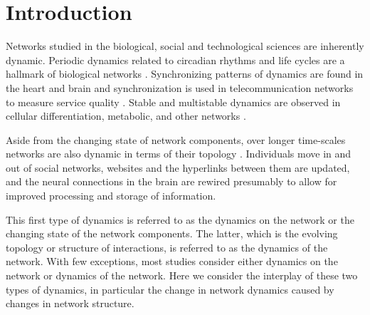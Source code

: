 \documentclass[12pt]{thesis}
\begin{document}

% 

\tableofcontents
\listoffigures

\mainmatter

\chapter{Introduction}\label{chapt:intro}
Networks studied in the biological, social and technological sciences are inherently dynamic.
Periodic dynamics related to circadian rhythms and life cycles are a hallmark of biological networks \cite{1}.
Synchronizing patterns of dynamics are found in the heart and brain \cite{2} and synchronization is used in telecommunication networks to measure service quality \cite{3,4}.
Stable and multistable dynamics are observed in cellular differentiation, metabolic, and other networks \cite{5,6}. 

Aside from the changing state of network components, over longer time-scales networks are also dynamic in terms of their topology \cite{7}.
Individuals move in and out of social networks, websites and the hyperlinks between them are updated, and the neural connections in the brain are rewired presumably to allow for improved processing and storage of information. 

This first type of dynamics is referred to as the {dynamics on} the network or the changing state of the network components.
The {latter}, which is the evolving {topology} or structure of interactions, is referred to as the {dynamics of} the network.
With few exceptions, most studies consider either {dynamics on} the network or {dynamics of} the network.
Here we consider the interplay of these two types of dynamics, in particular the change in network dynamics caused by changes in network structure. 
\end{document}
